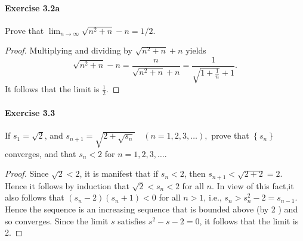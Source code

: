\documentclass{article}
\theoremstyle{definition}
\begin{document}
\paragraph{Exercise 3.2a} Prove that $\lim_{n \rightarrow \infty}\sqrt{n^2 + n} -n = 1/2$.
\begin{proof}
    Multiplying and dividing by $\sqrt{n^2+n}+n$ yields
$$
\sqrt{n^2+n}-n=\frac{n}{\sqrt{n^2+n}+n}=\frac{1}{\sqrt{1+\frac{1}{n}}+1} .
$$
It follows that the limit is $\frac{1}{2}$.
\end{proof}



\paragraph{Exercise 3.3} If $s_{1}=\sqrt{2}$, and $s_{n+1}=\sqrt{2+\sqrt{s_{n}}} \quad(n=1,2,3, \ldots),$ prove that $\left\{s_{n}\right\}$ converges, and that $s_{n}<2$ for $n=1,2,3, \ldots$.
\begin{proof}
    Since $\sqrt{2}<2$, it is manifest that if $s_n<2$, then $s_{n+1}<\sqrt{2+2}=2$. Hence it follows by induction that $\sqrt{2}<s_n<2$ for all $n$. In view of this fact,it also follows that $\left(s_n-2\right)\left(s_n+1\right)<0$ for all $n>1$, i.e., $s_n>s_n^2-2=s_{n-1}$. Hence the sequence is an increasing sequence that is bounded above (by 2 ) and so converges. Since the limit $s$ satisfies $s^2-s-2=0$, it follows that the limit is 2.
\end{proof}
\end{document}
